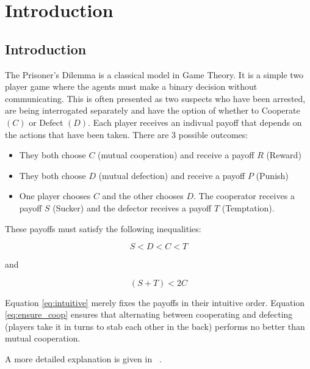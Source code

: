 \chapter{Introduction}\label{cha:introduction}

\section{Introduction}

The Prisoner's Dilemma is a classical model in Game Theory.
It is a simple two player game where the agents must make a binary decision without communicating.
This is often presented as two suspects who have been arrested, are being interrogated separately and have the option of whether to Cooperate $(C)$ or Defect $(D)$.
Each player receives an indivual payoff that depends on the actions that have been taken.
There are 3 possible outcomes:

\begin{itemize}  
\item They both choose $C$ (mutual cooperation) and receive a payoff $R$ (Reward)
\item They both choose $D$ (mutual defection) and receive a payoff $P$ (Punish)
\item One player chooses $C$ and the other chooses $D$. The cooperator receives a payoff $S$ (Sucker) and the defector receives a payoff $T$ (Temptation).
\end{itemize}

These payoffs must satisfy the following inequalities:

\begin{equation}\label{eq:intuitive}
S < D < C < T
\end{equation}

and

\begin{equation}\label{eq:ensure_coop}
(S + T) < 2 C
\end{equation}

Equation \ref{eq:intuitive} merely fixes the payoffs in their intuitive order.
Equation \ref{eq:ensure_coop} ensures that alternating between cooperating and defecting (players take it in turns to stab each other in the back) performs no better than mutual cooperation.

A more detailed explanation is given in ~\cite{Gotts2003}.



